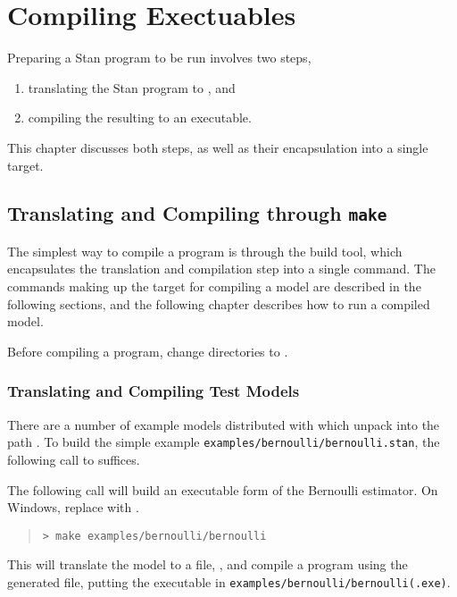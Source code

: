 \chapter{Compiling \CmdStan Exectuables}\label{compiling.chapter}

\noindent
Preparing a Stan program to be run involves two steps,
%
\begin{enumerate}
\item translating the Stan program to \Cpp, and
\item compiling the resulting \Cpp to an executable.
\end{enumerate}
%
This chapter discusses both steps, as well as their encapsulation into
a single  target.

\section{Translating and Compiling through {\tt\bfseries make}}\label{make-models.section}

The simplest way to compile a \CmdStan program is through the
 build tool, which encapsulates the translation and
compilation step into a single command.  The commands making up the
 target for compiling a model are described in the
following sections, and the following chapter describes how to run a
compiled model.

Before compiling a \CmdStan program, change directories to
. 

\subsection{Translating and Compiling Test Models}

There are a number of example models distributed with \CmdStan which
unpack into the path .  To build the simple example
\nolinkurl{examples/bernoulli/bernoulli.stan}, the following call to
 suffices.

%
The following call will build an executable form of the Bernoulli
estimator. On Windows, replace  with .
%
\begin{quote}
\begin{Verbatim}[fontshape=sl]
> make examples/bernoulli/bernoulli
\end{Verbatim}
\end{quote}
%
This will translate the model  to a \Cpp file,
, and compile a \CmdStan program using the
generated \Cpp file, putting the executable in
\nolinkurl{examples/bernoulli/bernoulli(.exe)}.

